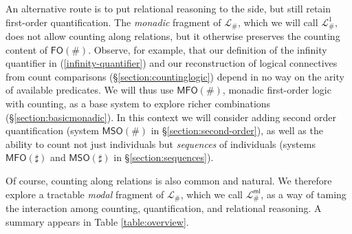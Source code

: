 \documentclass[12pt,oneside,reqno]{amsart}
\theoremstyle{definition}
\begin{document}
An alternative route is to put relational reasoning to the side, but still retain first-order quantification. The \emph{monadic} fragment of $\mathcal{L}_\#$, which we will call $\mathcal{L}_\#^1$, does not allow counting along relations, but it otherwise preserves the counting content of $\mathsf{FO}(\#)$. Observe, for example, that our definition of the infinity quantifier in (\ref{infinity-quantifier}) and our reconstruction of logical connectives from count comparisons (\S\ref{section:countinglogic}) depend in no way on the arity of available predicates. We will thus use $\mathsf{MFO}(\#)$, monadic first-order logic with counting, as a base system to explore richer combinations (\S\ref{section:basicmonadic}). In this context we will consider adding second order quantification (system $\mathsf{MSO}(\#)$ in \S\ref{section:second-order}), as well as the ability to count not just individuals but \emph{sequences} of individuals (systems $\mathsf{MFO}(\sharp)$ and $\mathsf{MSO}(\sharp)$ in \S\ref{section:sequences}). 

Of course, counting along relations is also common and natural. We therefore explore a tractable \emph{modal} fragment of $\mathcal{L}_\#$, which we call $\mathcal{L}_\#^{\mathsf{ml}}$, as a way of taming the interaction among counting, quantification, and relational reasoning.  A summary appears in Table \ref{table:overview}.
\end{document}
